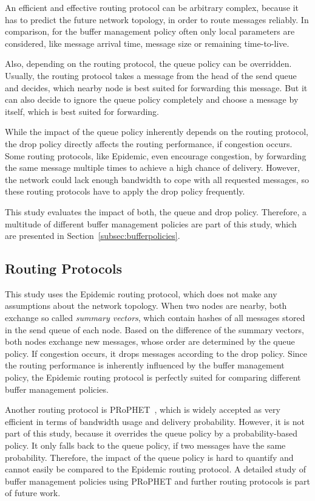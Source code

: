 \documentclass[conference,10pt,letterpaper,final]{IEEEtran}
\begin{document}
An efficient and effective routing protocol can be arbitrary complex, because it has to predict the future network topology, in order to route messages reliably.
In comparison, for the buffer management policy often only local parameters are considered, like message arrival time, message size or remaining time-to-live.

Also, depending on the routing protocol, the queue policy can be overridden.
Usually, the routing protocol takes a message from the head of the send queue and decides, which nearby node is best suited for forwarding this message.
But it can also decide to ignore the queue policy completely and choose a message by itself, which is best suited for forwarding.

While the impact of the queue policy inherently depends on the routing protocol, the drop policy directly affects the routing performance, if congestion occurs.
Some routing protocols, like Epidemic, even encourage congestion, by forwarding the same message multiple times to achieve a high chance of delivery.
However, the network could lack enough bandwidth to cope with all requested messages, so these routing protocols have to apply the drop policy frequently.

This study evaluates the impact of both, the queue and drop policy.
Therefore, a multitude of different buffer management policies are part of this study, which are presented in Section~\ref{subsec:bufferpolicies}.


\subsection{Routing Protocols}
\label{subsec:epidemic}

This study uses the Epidemic routing protocol, which does not make any assumptions about the network topology.
When two nodes are nearby, both exchange so called \emph{summary vectors}, which contain hashes of all messages stored in the send queue of each node.
Based on the difference of the summary vectors, both nodes exchange new messages, whose order are determined by the queue policy.
If congestion occurs, it drops messages according to the drop policy.
Since the routing performance is inherently influenced by the buffer management policy, the Epidemic routing protocol is perfectly suited for comparing different buffer management policies.

Another routing protocol is PRoPHET~\cite{prophet}, which is widely accepted as very efficient in terms of bandwidth usage and delivery probability.
However, it is not part of this study, because it overrides the queue policy by a probability-based policy.
It only falls back to the queue policy, if two messages have the same probability.
Therefore, the impact of the queue policy is hard to quantify and cannot easily be compared to the Epidemic routing protocol.
A detailed study of buffer management policies using PRoPHET and further routing protocols is part of future work.
\end{document}
